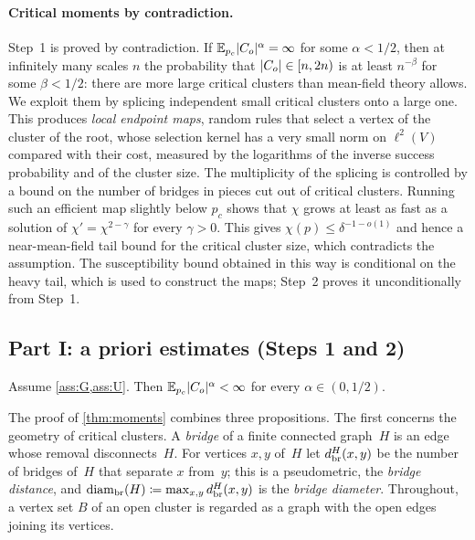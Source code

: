\paragraph{Critical moments by contradiction.}
Step~1 is proved by contradiction. If $\mathbb E_{p_c}\lvert C_o\rvert^\alpha=\infty$ for some $\alpha<1/2$, then at
infinitely many scales $n$ the probability that $\lvert C_o\rvert\in[n,2n)$ is at least $n^{-\beta}$ for some
$\beta<1/2$: there are more large critical clusters than mean-field theory allows. We exploit them by
splicing independent small critical clusters onto a large one. This produces \emph{local endpoint
maps}, random rules that select a vertex of the cluster of the root, whose selection kernel has a very
small norm on $\ell^2(V)$ compared with their cost, measured by the logarithms of the inverse success
probability and of the cluster size. The multiplicity of the splicing is controlled by a bound on the
number of bridges in pieces cut out of critical clusters. Running such an efficient map slightly below
$p_c$ shows that $\chi$ grows at least as fast as a solution of $\chi'=\chi^{2-\gamma}$ for every
$\gamma>0$. This gives $\chi(p)\le\delta^{-1-o(1)}$ and hence a near-mean-field tail bound for the
critical cluster size, which contradicts the assumption. The susceptibility bound obtained in this way
is conditional on the heavy tail, which is used to construct the maps; Step~2 proves it unconditionally
from Step~1.

\subsection{Part I: a priori estimates (Steps 1 and 2)}\label{sec:part1}

\begin{theorem}\label{thm:moments}
Assume \cref{ass:G,ass:U}. Then $\mathbb E_{p_c}\lvert C_o\rvert^\alpha<\infty$ for every $\alpha\in(0,1/2)$.
\end{theorem}

The proof of \cref{thm:moments} combines three propositions. The first concerns the geometry of
critical clusters. A \emph{bridge} of a finite connected graph~$H$ is an edge whose removal
disconnects~$H$. For vertices $x,y$ of~$H$ let $d_{\mathrm{br}}^H(x,y)$ be the number of bridges of~$H$ that
separate $x$ from~$y$; this is a pseudometric, the \emph{bridge distance}, and
$\operatorname{diam}_{\mathrm{br}}(H)\coloneqq\max_{x,y}d_{\mathrm{br}}^H(x,y)$ is the \emph{bridge diameter}. Throughout, a vertex set $B$
of an open cluster is regarded as a graph with the open edges joining its vertices.

